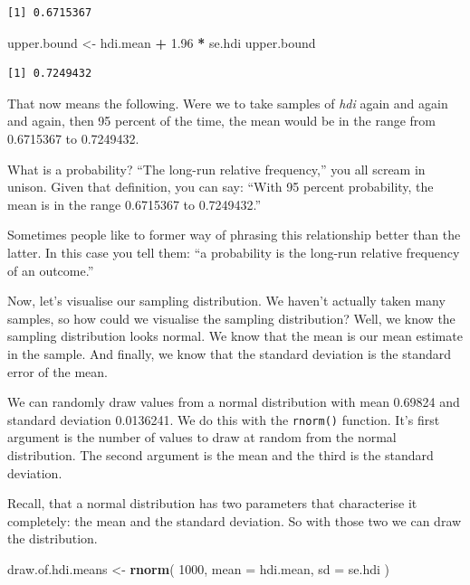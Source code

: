 \documentclass[]{book}
\newenvironment{Shaded}{\begin{snugshade}}{\end{snugshade}}
\newcommand{\KeywordTok}[1]{\textcolor[rgb]{0.13,0.29,0.53}{\textbf{#1}}}
\newcommand{\DataTypeTok}[1]{\textcolor[rgb]{0.13,0.29,0.53}{#1}}
\newcommand{\DecValTok}[1]{\textcolor[rgb]{0.00,0.00,0.81}{#1}}
\newcommand{\FloatTok}[1]{\textcolor[rgb]{0.00,0.00,0.81}{#1}}
\newcommand{\StringTok}[1]{\textcolor[rgb]{0.31,0.60,0.02}{#1}}
\newcommand{\OperatorTok}[1]{\textcolor[rgb]{0.81,0.36,0.00}{\textbf{#1}}}
\newcommand{\NormalTok}[1]{#1}
\theoremstyle{definition}
\theoremstyle{definition}
\theoremstyle{definition}
\theoremstyle{remark}
\begin{document}
\begin{verbatim}
[1] 0.6715367
\end{verbatim}

\begin{Shaded}
\begin{Highlighting}[]
\NormalTok{upper.bound <-}\StringTok{ }\NormalTok{hdi.mean }\OperatorTok{+}\StringTok{ }\FloatTok{1.96} \OperatorTok{*}\StringTok{ }\NormalTok{se.hdi}
\NormalTok{upper.bound}
\end{Highlighting}
\end{Shaded}

\begin{verbatim}
[1] 0.7249432
\end{verbatim}

That now means the following. Were we to take samples of \emph{hdi}
again and again and again, then 95 percent of the time, the mean would
be in the range from 0.6715367 to 0.7249432.

What is a probability? ``The long-run relative frequency,'' you all
scream in unison. Given that definition, you can say: ``With 95 percent
probability, the mean is in the range 0.6715367 to 0.7249432.''

Sometimes people like to former way of phrasing this relationship better
than the latter. In this case you tell them: ``a probability is the
long-run relative frequency of an outcome.''

Now, let's visualise our sampling distribution. We haven't actually
taken many samples, so how could we visualise the sampling distribution?
Well, we know the sampling distribution looks normal. We know that the
mean is our mean estimate in the sample. And finally, we know that the
standard deviation is the standard error of the mean.

We can randomly draw values from a normal distribution with mean 0.69824
and standard deviation 0.0136241. We do this with the \texttt{rnorm()}
function. It's first argument is the number of values to draw at random
from the normal distribution. The second argument is the mean and the
third is the standard deviation.

Recall, that a normal distribution has two parameters that characterise
it completely: the mean and the standard deviation. So with those two we
can draw the distribution.

\begin{Shaded}
\begin{Highlighting}[]
\NormalTok{draw.of.hdi.means <-}\StringTok{ }\KeywordTok{rnorm}\NormalTok{( }\DecValTok{1000}\NormalTok{, }\DataTypeTok{mean =}\NormalTok{ hdi.mean, }\DataTypeTok{sd =}\NormalTok{ se.hdi )}
\end{Highlighting}
\end{Shaded}
\end{document}
